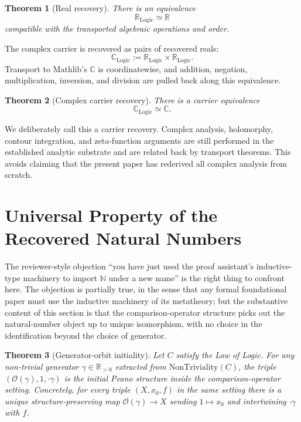 \documentclass[11pt,a4paper]{article}
\newtheorem{theorem}{Theorem}
\theoremstyle{definition}
\theoremstyle{remark}
\begin{document}
\begin{theorem}[Real recovery]
There is an equivalence
\[
\mathbb{R}_{\mathrm{Logic}} \simeq \mathbb{R}
\]
compatible with the transported algebraic operations and order.
\end{theorem}

The complex carrier is recovered as pairs of recovered reals:
\[
\mathbb{C}_{\mathrm{Logic}} :=
\mathbb{R}_{\mathrm{Logic}} \times \mathbb{R}_{\mathrm{Logic}}.
\]
Transport to Mathlib's $\mathbb{C}$ is coordinatewise, and addition,
negation, multiplication, inversion, and division are pulled back along
this equivalence.

\begin{theorem}[Complex carrier recovery]
There is a carrier equivalence
\[
\mathbb{C}_{\mathrm{Logic}} \simeq \mathbb{C}.
\]
\end{theorem}

We deliberately call this a carrier recovery. Complex analysis,
holomorphy, contour integration, and zeta-function arguments are still
performed in the established analytic substrate and are related back by
transport theorems. This avoids claiming that the present paper has
rederived all complex analysis from scratch.

\section{Universal Property of the Recovered Natural Numbers}
\label{sec:universal}

The reviewer-style objection ``you have just used the proof assistant's
inductive-type machinery to import $\mathbb{N}$ under a new name'' is
the right thing to confront here. The objection is partially true, in
the sense that any formal foundational paper must use the inductive
machinery of its metatheory; but the substantive content of this
section is that the comparison-operator structure picks out the
natural-number object up to unique isomorphism, with no choice in the
identification beyond the choice of generator.

\begin{theorem}[Generator-orbit initiality]
\label{thm:initiality}
Let $C$ satisfy the Law of Logic. For any non-trivial generator
$\gamma \in \mathbb{R}_{>0}$ extracted from
$\mathrm{NonTriviality}(C)$, the triple $(\mathcal{O}(\gamma), 1, \cdot
\gamma)$ is the initial Peano structure inside the comparison-operator
setting. Concretely, for every triple $(X, x_0, f)$ in the same setting
there is a unique structure-preserving map
$\mathcal{O}(\gamma) \to X$ sending $1 \mapsto x_0$ and intertwining
$\cdot \gamma$ with $f$.
\end{theorem}
\end{document}
